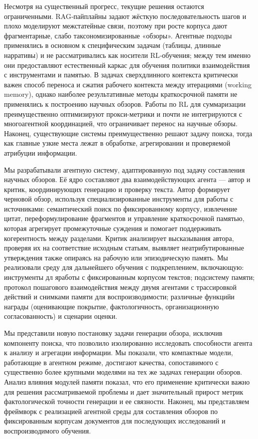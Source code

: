 \documentclass{article}
\begin{document}
Несмотря на существенный прогресс, текущие решения остаются ограниченными. RAG‑пайплайны задают жёсткую последовательность шагов и плохо моделируют межстатейные связи, поэтому при росте корпуса дают фрагментарные, слабо таксономизированные «обзоры». Агентные подходы применялись в основном к специфическим задачам (таблицы, длинные нарративы) и не рассматривались как носители RL‑обучения; между тем именно они предоставляют естественный каркас для обучения политики взаимодействия с инструментами и памятью. В задачах сверхдлинного контекста критически важен способ переноса и сжатия рабочего контекста между итерациями (working memory), однако наиболее результативные методы краткосрочной памяти  не применялись к построению научных обзоров. Работы по RL для суммаризации преимущественно оптимизируют прокси‑метрики и почти не интегрируются с многоагентной координацией, что ограничивает перенос на научные обзоры. Наконец, существующие системы преимущественно решают задачу поиска, тогда как главные узкие места лежат в обработке, агрегировании и проверяемой атрибуции информации.

Мы разрабатывали агентную систему, адаптированную под задачу составления научных обзоров. Её ядро составляют два взаимодействующих агента — автор и критик, координирующих генерацию и проверку текста. Автор формирует черновой обзор, используя специализированные инструменты для работы с источниками: семантический поиск по фиксированному корпусу, извлечение цитат, переформулирование фрагментов и управление краткосрочной памятью, которая агрегирует промежуточные суждения и помогает поддерживать когерентность между разделами. Критик анализирует высказывания автора, проверяя их на соответствие исходным статьям, выявляет неатрибутированные утверждения также опираясь на рабочую или эпизодическую память. Мы реализовали  среду для дальнейшего обучения с подкреплением, включающую: инструменты дл яработы с фиксированным корпусом текстов; подсистему памяти; протокол пошагового взаимодействия между двумя агентами с трассировкой действий и снимками памяти для воспроизводимости; различные функцийи награды (оценивающие покрытие, фактологичность, организационную согласованность) и сценарии оценки.

Мы представили новую постановку задачи генерации обзора, исключив компоненту поиска, что позволило изолированно исследовать способности агента к анализу и агрегации информации. Мы показали, что компактные модели, работающие в агентном режиме, достигают качества, сопоставимого с существенно более крупными моделями на тех же задачах генерации обзоров. Анализ влияния модулей памяти показал, что его применение критически важно для решения рассматриваемой проблемы и дает значительный прирост метрик фактологической точности генерации и ее связности. Наконец, мы представляем фреймворк с реализацией агентной среды для составления обзоров по фиксированным корпусам документов для последующих исследований и воспроизводимого обучения.
\end{document}
